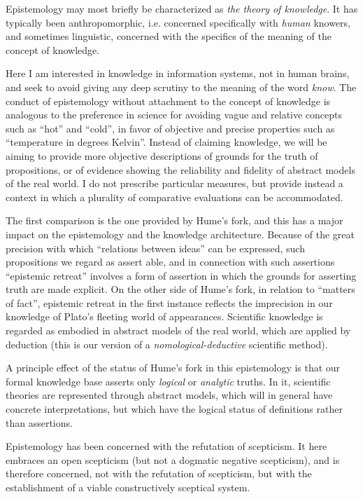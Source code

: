 Epistemology may most briefly be characterized as \emph{the theory of
  knowledge}. 
It has typically been anthropomorphic, i.e. concerned specifically
with \emph{human} knowers, and sometimes linguistic, concerned with
the specifics of the meaning of the concept of knowledge. 

Here I am interested in knowledge in information systems, not in human
brains, and seek to avoid giving any deep scrutiny to the meaning of
the word \emph{know}.
The conduct of epistemology without attachment to the concept of
knowledge is analogous to the preference in science for avoiding vague and
relative concepts such as ``hot'' and ``cold'', in favor of objective
and precise properties such as ``temperature in degrees Kelvin''.
Instead of claiming knowledge, we will be aiming to provide more
objective descriptions of grounds for the truth of
propositions, or of evidence showing the reliability and fidelity of
abstract models of the real world.
I do not prescribe particular measures, but provide instead a context
in which a plurality of comparative evaluations can be accommodated.

The first comparison is the one provided by Hume's fork, and this has
a major impact on the epistemology and the knowledge architecture.
Because of the great precision with which ``relations between ideas''
can be expressed, such propositions we regard as assert able, and in
connection with such assertions ``epistemic retreat'' involves a form
of assertion in which the grounds for asserting truth are made
explicit.
On the other side of Hume's fork, in relation to ``matters of fact'',
epistemic retreat in the first instance reflects the imprecision in
our knowledge of Plato's fleeting world of appearances.
Scientific knowledge is regarded as embodied in abstract models of the
real world, which are applied by deduction (this is our version of a
\emph{nomological-deductive} scientific method).

A principle effect of the status of Hume's fork in this epistemology
is that our formal knowledge base asserts only \emph{logical} or
\emph{analytic} truths.
In it, scientific theories are represented through abstract models,
which will in general have concrete interpretations, but which have
the logical status of definitions rather than assertions.

Epistemology has been concerned with the refutation of scepticism.
It here embraces an open scepticism (but not a dogmatic negative
scepticism), and is therefore concerned, not with the refutation of
scepticism, but with the establishment of a viable constructively
sceptical system.


